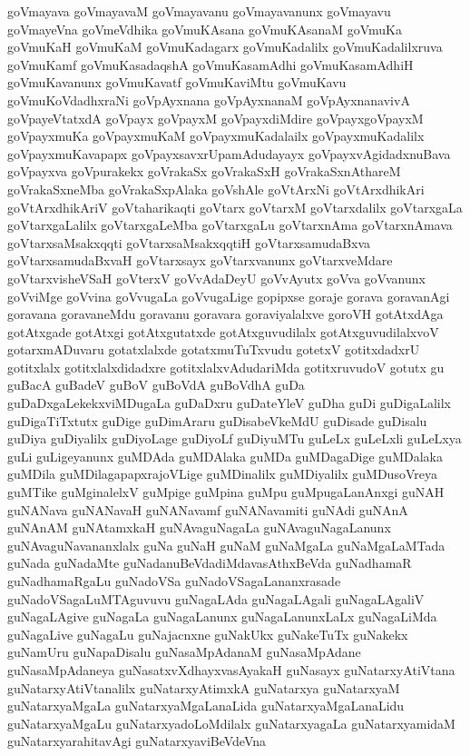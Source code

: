 {goVmayava
goVmayavaM
goVmayavanu
goVmayavanunx
goVmayavu
goVmayeVna
goVmeVdhika
goVmuKAsana
goVmuKAsanaM
goVmuKa
goVmuKaH
goVmuKaM
goVmuKadagarx
goVmuKadalilx
goVmuKadalilxruva
goVmuKamf
goVmuKasadaqshA
goVmuKasamAdhi
goVmuKasamAdhiH
goVmuKavanunx
goVmuKavatf
goVmuKaviMtu
goVmuKavu
goVmuKoVdadhxraNi
goVpAyxnana
goVpAyxnanaM
goVpAyxnanavivA
goVpayeVtatxdA
goVpayx
goVpayxM
goVpayxdiMdire
goVpayxgoVpayxM
goVpayxmuKa
goVpayxmuKaM
goVpayxmuKadalailx
goVpayxmuKadalilx
goVpayxmuKavapapx
goVpayxsavxrUpamAdudayayx
goVpayxvAgidadxnuBava
goVpayxva
goVpurakekx
goVrakaSx
goVrakaSxH
goVrakaSxnAthareM
goVrakaSxneMba
goVrakaSxpAlaka
goVshAle
goVtArxNi
goVtArxdhikAri
goVtArxdhikAriV
goVtaharikaqti
goVtarx
goVtarxM
goVtarxdalilx
goVtarxgaLa
goVtarxgaLalilx
goVtarxgaLeMba
goVtarxgaLu
goVtarxnAma
goVtarxnAmava
goVtarxsaMsakxqqti
goVtarxsaMsakxqqtiH
goVtarxsamudaBxva
goVtarxsamudaBxvaH
goVtarxsayx
goVtarxvanunx
goVtarxveMdare
goVtarxvisheVSaH
goVterxV
goVvAdaDeyU
goVvAyutx
goVva
goVvanunx
goVviMge
goVvina
goVvugaLa
goVvugaLige
gopipxse
goraje
gorava
goravanAgi
goravana
goravaneMdu
goravanu
goravara
goraviyalalxve
goroVH
gotAtxdAga
gotAtxgade
gotAtxgi
gotAtxgutatxde
gotAtxguvudilalx
gotAtxguvudilalxvoV
gotarxmADuvaru
gotatxlalxde
gotatxmuTuTxvudu
gotetxV
gotitxdadxrU
gotitxlalx
gotitxlalxdidadxre
gotitxlalxvAdudariMda
gotitxruvudoV
gotutx
gu
guBacA
guBadeV
guBoV
guBoVdA
guBoVdhA
guDa
guDaDxgaLekekxviMDugaLa
guDaDxru
guDateYleV
guDha
guDi
guDigaLalilx
guDigaTiTxtutx
guDige
guDimAraru
guDisabeVkeMdU
guDisade
guDisalu
guDiya
guDiyalilx
guDiyoLage
guDiyoLf
guDiyuMTu
guLeLx
guLeLxli
guLeLxya
guLi
guLigeyanunx
guMDAda
guMDAlaka
guMDa
guMDagaDige
guMDalaka
guMDila
guMDilagapapxrajoVLige
guMDinalilx
guMDiyalilx
guMDusoVreya
guMTike
guMginalelxV
guMpige
guMpina
guMpu
guMpugaLanAnxgi
guNAH
guNANava
guNANavaH
guNANavamf
guNANavamiti
guNAdi
guNAnA
guNAnAM
guNAtamxkaH
guNAvaguNagaLa
guNAvaguNagaLanunx
guNAvaguNavananxlalx
guNa
guNaH
guNaM
guNaMgaLa
guNaMgaLaMTada
guNada
guNadaMte
guNadanuBeVdadiMdavasAthxBeVda
guNadhamaR
guNadhamaRgaLu
guNadoVSa
guNadoVSagaLananxrasade
guNadoVSagaLuMTAguvuvu
guNagaLAda
guNagaLAgali
guNagaLAgaliV
guNagaLAgive
guNagaLa
guNagaLanunx
guNagaLanunxLaLx
guNagaLiMda
guNagaLive
guNagaLu
guNajacnxne
guNakUkx
guNakeTuTx
guNakekx
guNamUru
guNapaDisalu
guNasaMpAdanaM
guNasaMpAdane
guNasaMpAdaneya
guNasatxvXdhayxvasAyakaH
guNasayx
guNatarxyAtiVtana
guNatarxyAtiVtanalilx
guNatarxyAtimxkA
guNatarxya
guNatarxyaM
guNatarxyaMgaLa
guNatarxyaMgaLanaLida
guNatarxyaMgaLanaLidu
guNatarxyaMgaLu
guNatarxyadoLoMdilalx
guNatarxyagaLa
guNatarxyamidaM
guNatarxyarahitavAgi
guNatarxyaviBeVdeVna
}
